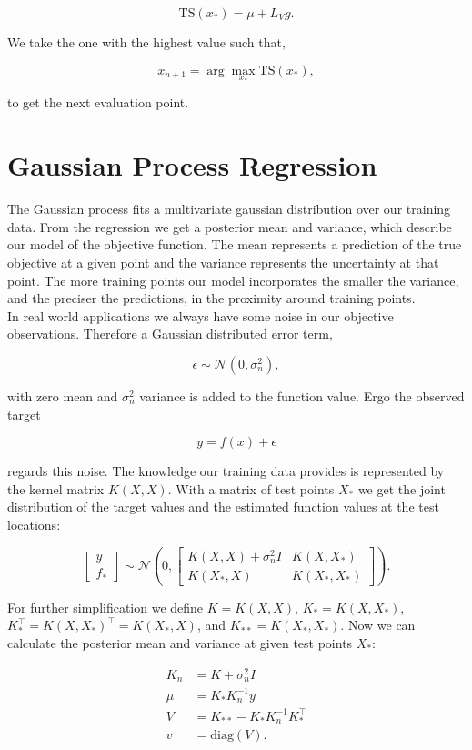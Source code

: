 $$\mathrm{TS}(x_*) = \mu + L_V g.$$

We take the one with the highest value such that,

$$x_{n+1} = \arg \max_{x_*} \mathrm{TS}(x_*),$$

to get the next evaluation point.

\section{Gaussian Process Regression}
The Gaussian process fits a multivariate gaussian distribution over our training data. From the regression we get a posterior mean and variance, which describe our model of the objective function. The mean represents a prediction of the true objective at a given point and the variance represents the uncertainty at that point. The more training points our model incorporates the smaller the variance, and the preciser the predictions, in the proximity around training points.\\
In real world applications we always have some noise in our objective observations. Therefore a Gaussian distributed error term,

$$\epsilon \sim \mathcal{N}(0,\sigma_n^2),$$

with zero mean and $\sigma_n^2$ variance is added to the function value. Ergo the observed target

$$y = f(x) + \epsilon$$

regards this noise. The knowledge our training data provides is represented by the kernel matrix $K(X,X)$. With a matrix of test points $X_*$ we get the joint distribution of the target values and the estimated function values at the test locations:

$$\left[ \begin{array}{c} y \\ f_* \end{array} \right] \sim \mathcal{N} \left(0, \begin{bmatrix} K(X,X)+\sigma_n^2 I & K(X,X_*) \\ K(X_*,X) & K(X_*,X_*) \end{bmatrix} \right).$$

For further simplification we define $K = K(X,X)$, $K_* = K(X,X_*)$, $K_*^{\top} = K(X,X_*)^{\top} = K(X_*,X)$, and $K_{**} = K(X_*,X_*)$. Now we can calculate the posterior mean and variance at given test points $X_*$:

\begin{align}
    K_n &= K+\sigma_n^2 I \label{eq:kNoise} \\
    \mu &= K_*K_n^{-1}y \label{eq:meanGauss} \\
    V &= K_{**}-K_*K_n^{-1}K_*^\top \label{eq:wholeVar} \\
    v &= \mathrm{diag}(V). \label{eq:vectorVar} \\ \nonumber
\end{align}

